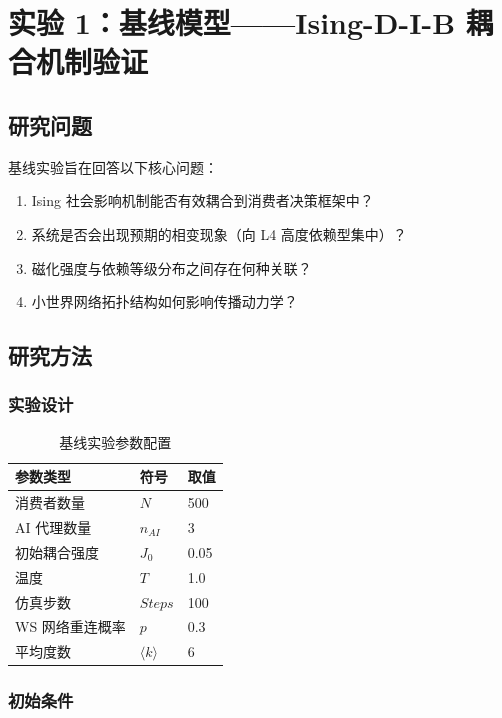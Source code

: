 \documentclass[a4paper,12pt]{article}
\begin{document}
\section{实验 1：基线模型——Ising-D-I-B 耦合机制验证}

\subsection{研究问题}

基线实验旨在回答以下核心问题：
\begin{enumerate}
    \item Ising 社会影响机制能否有效耦合到消费者决策框架中？
    \item 系统是否会出现预期的相变现象（向 L4 高度依赖型集中）？
    \item 磁化强度与依赖等级分布之间存在何种关联？
    \item 小世界网络拓扑结构如何影响传播动力学？
\end{enumerate}

\subsection{研究方法}

\subsubsection{实验设计}

\begin{table}[H]
\centering
\caption{基线实验参数配置}
\begin{tabular}{lll}
\toprule
\textbf{参数类型} & \textbf{符号} & \textbf{取值} \\
\midrule
消费者数量 & $N$ & 500 \\
AI 代理数量 & $n_{AI}$ & 3 \\
初始耦合强度 & $J_0$ & 0.05 \\
温度 & $T$ & 1.0 \\
仿真步数 & $Steps$ & 100 \\
WS 网络重连概率 & $p$ & 0.3 \\
平均度数 & $\langle k \rangle$ & 6 \\
\bottomrule
\end{tabular}
\end{table}

\subsubsection{初始条件}
\end{document}
